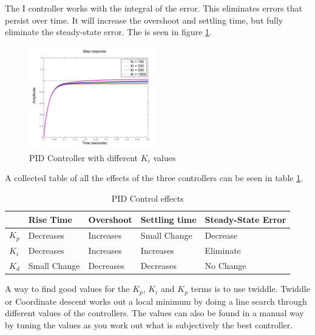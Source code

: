 The I controller works with the integral of the error. This eliminates errors that persist over time. It will increase the overshoot and settling time, but fully eliminate the steady-state error. The is seen in figure \ref{fig:pidcontrol}.
\begin{figure}[H]
\centering
\includegraphics[width=0.5\textwidth]{billeder/pidcontrol}
\caption{PID Controller with different $K_i$ values}
\label{fig:pidcontrol}
\end{figure}
A collected table of all the effects of the three controllers can be seen in table \ref{tab:PIDcontrol}.
\begin{table}[H]
	\centering
    \begin{tabular}{|l|l|l|l|l|}
    \hline
    ~  & Rise Time    & Overshoot & Settling time & Steady-State Error \\ \hline
    $K_p$ & Decreases    & Increases & Small Change  & Decrease           \\ \hline
    $K_i$ & Decreases    & Increases & Increases     & Eliminate          \\ \hline
    $K_d$ & Small Change & Decreases & Decreases     & No Change          \\ \hline
    \end{tabular}
    \caption{PID Control effects}
    \label{tab:PIDcontrol}
\end{table}
A way to find good values for the $K_p$, $K_i$ and $K_p$ terms is to use twiddle. Twiddle or Coordinate descent works out a local minimum by doing a line search through different values of the controllers. The values can also be found in a manual way by tuning the values as you work out what is subjectively the best controller.

